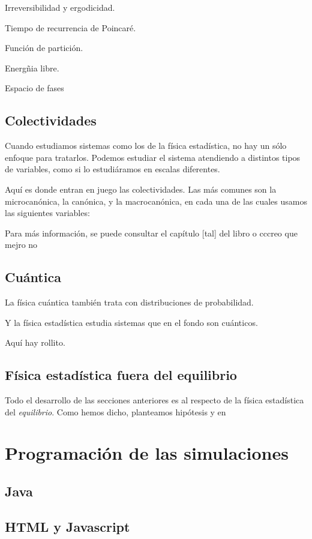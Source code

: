 \documentclass[11pt, a4paper]{article} %
\theoremstyle{named}
\begin{document}
Irreversibilidad y ergodicidad.

Tiempo de recurrencia de Poincaré.

Función de partición.

Energñia libre.

Espacio de fases

\subsection{Colectividades}

Cuando estudiamos sistemas como los de la física estadística, no hay un sólo enfoque para tratarlos. Podemos estudiar el sistema atendiendo a distintos tipos de variables, como si lo estudiáramos en escalas diferentes.

Aquí es donde entran en juego las colectividades. Las más comunes son la microcanónica, la canónica, y la macrocanónica, en cada una de las cuales usamos las siguientes variables:

Para más información, se puede consultar el capítulo [tal] del libro \cite{salcido} o cccreo que mejro no

\subsection{Cuántica}

La física cuántica también trata con distribuciones de probabilidad.

Y la física estadística estudia sistemas que en el fondo son cuánticos.

Aquí hay rollito.

\subsection{Física estadística fuera del equilibrio}

Todo el desarrollo de las secciones anteriores es al respecto de la física estadística del \textit{equilibrio}. Como hemos dicho, planteamos hipótesis y en

\section{Programación de las simulaciones}\label{sec:programa}

\subsection{Java}
\subsection{HTML y Javascript}\label{sec:html}
\end{document}
